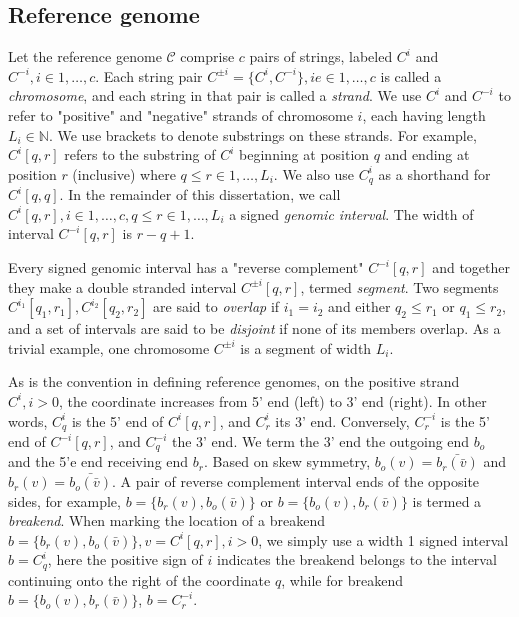 \documentclass[phd,tocprelim]{cornell}
\begin{document}
\subsection{Reference genome}
Let the reference genome $\mathcal{C}$ comprise $c$ pairs of strings, labeled $C^i$ and $C^{-i}, i \in 1,\dots,c$. Each string pair $C^{\pm{i}} = \{C^i, C^{-i}\}, i e\in 1,\dots, c$ is called a \textit{chromosome}, and each string in that pair is called a \textit{strand}. We use $C^i$ and $C^{-i}$ to refer to "positive" and "negative" strands of chromosome $i$, each having length $L_i \in \mathbb{N}$. We use brackets to denote substrings on these strands. For example, $C^{i}[q,r]$ refers to the substring of $C^{i}$ beginning at position $q$ and ending at position $r$ (inclusive) where $q \le r \in 1,\dots,L_i$. We also use $C^{i}_q$ as a shorthand for $C^{i}[q,q]$. In the remainder of this dissertation, we call $C^{i}[q,r], i \in 1, \dots, c, q \le r \in 1, \dots, L_i$ a signed \textit{genomic interval}. The width of interval $C^{-i}[q,r]$ is $r-q+1$.

Every signed genomic interval has a "reverse complement" $C^{-i}[q,r]$ and together they make a double stranded interval $C^{\pm{i}}[q,r]$, termed \textit{segment}. Two segments $C^{i_1}[q_1, r_1], C^{i_2}[q_2, r_2]$ are said to \textit{overlap} if $i_1 = i_2$ and either $q_2 \le r_1$ or $q_1 \le r_2$, and a set of intervals are said to be \textit{disjoint} if none of its members overlap. As a trivial example, one chromosome $C^{\pm{i}}$ is a segment of width $L_i$.

As is the convention in defining reference genomes, on the positive strand $C^i, i>0$, the coordinate increases from 5' end (left) to 3' end (right). In other words, $C^{i}_q$ is the 5' end of $C^{i}[q,r]$, and $C^{i}_r$ its 3' end. Conversely, $C^{-i}_r$ is the 5' end of $C^{-i}[q,r]$, and $C^{-i}_q$ the 3' end. We term the 3' end the outgoing end $b_o$ and the 5'e end receiving end $b_r$. Based on skew symmetry, $b_o (v)= \bar{b_r(\bar{v})}$ and $b_r(v) = \bar{b_o(\bar{v})}$. A pair of reverse complement interval ends of the opposite sides, for example, $b = \{b_r(v), b_o(\bar{v})\}$ or $b = \{b_o(v), b_r(\bar{v})\}$ is termed a \textit{breakend}. When marking the location of a breakend $b = \{b_r(v), b_o(\bar{v})\}, v = C^{i}[q,r], i>0$, we simply use a width 1 signed interval $b = C^{i}_{q}$, here the positive sign of $i$ indicates the breakend belongs to the interval continuing onto the right of the coordinate $q$, while for breakend $b = \{b_o(v), b_r(\bar{v})\}$, $b = C^{-i}_r$.
\end{document}
